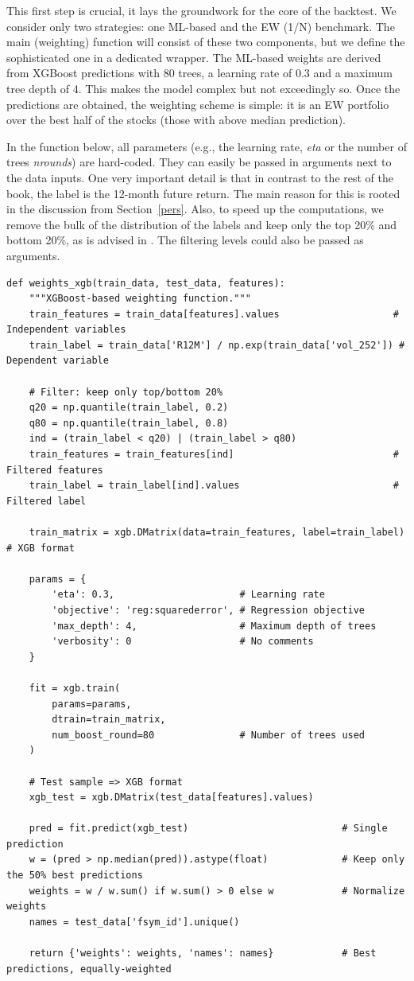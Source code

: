 This first step is crucial, it lays the groundwork for the core of the backtest. We consider only two strategies: one ML-based and the EW (1/N) benchmark. The main (weighting) function will consist of these two components, but we define the sophisticated one in a dedicated wrapper. The ML-based weights are derived from XGBoost predictions with 80 trees, a learning rate of 0.3 and a maximum tree depth of 4. This makes the model complex but not exceedingly so. Once the predictions are obtained, the weighting scheme is simple: it is an EW portfolio over the best half of the stocks (those with above median prediction).

In the function below, all parameters (e.g., the learning rate, \textit{eta} or the number of trees \textit{nrounds}) are hard-coded. They can easily be passed in arguments next to the data inputs. One very important detail is that in contrast to the rest of the book, the label is the 12-month future return. The main reason for this is rooted in the discussion from Section~\ref{pers}. Also, to speed up the computations, we remove the bulk of the distribution of the labels and keep only the top 20\% and bottom 20\%, as is advised in \cite{coqueret2019training}. The filtering levels could also be passed as arguments.

\begin{verbatim}
def weights_xgb(train_data, test_data, features):
    """XGBoost-based weighting function."""
    train_features = train_data[features].values                    # Independent variables
    train_label = train_data['R12M'] / np.exp(train_data['vol_252']) # Dependent variable
    
    # Filter: keep only top/bottom 20%
    q20 = np.quantile(train_label, 0.2)
    q80 = np.quantile(train_label, 0.8)
    ind = (train_label < q20) | (train_label > q80)
    train_features = train_features[ind]                            # Filtered features
    train_label = train_label[ind].values                           # Filtered label
    
    train_matrix = xgb.DMatrix(data=train_features, label=train_label)  # XGB format
    
    params = {
        'eta': 0.3,                      # Learning rate
        'objective': 'reg:squarederror', # Regression objective
        'max_depth': 4,                  # Maximum depth of trees
        'verbosity': 0                   # No comments
    }
    
    fit = xgb.train(
        params=params,
        dtrain=train_matrix,
        num_boost_round=80               # Number of trees used
    )
    
    # Test sample => XGB format
    xgb_test = xgb.DMatrix(test_data[features].values)
    
    pred = fit.predict(xgb_test)                           # Single prediction
    w = (pred > np.median(pred)).astype(float)             # Keep only the 50% best predictions
    weights = w / w.sum() if w.sum() > 0 else w            # Normalize weights
    names = test_data['fsym_id'].unique()
    
    return {'weights': weights, 'names': names}            # Best predictions, equally-weighted
\end{verbatim}

